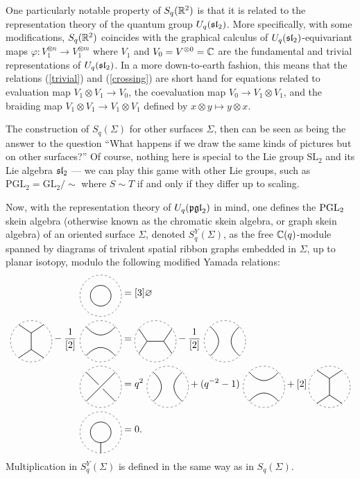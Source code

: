 One particularly notable property of $S_q(\mathbb{R}^2)$ is that
it is related to the representation theory of the quantum group
$U_q(\mathfrak{sl}_2)$. More specifically, with some modifications,
$S_q(\mathbb{R}^2)$ coincides with the graphical calculus of
$U_q(\mathfrak{sl}_2)$-equivariant maps $\varphi: V_1^{\otimes n} \to V_1^{\otimes m}$
where $V_1$ and $V_0 = V^{\otimes 0} = \mathbb{C}$
are the fundamental and trivial representations of $U_q(\mathfrak{sl}_2)$.
In a more down-to-earth fashion, this means that the relations
(\ref{trivial}) and (\ref{crossing}) are short hand for equations
related to evaluation map $V_1 \otimes V_1 \to V_0$, the coevaluation map $V_0 \to V_1 \otimes V_1$,
and the braiding map $V_1 \otimes V_1 \to V_1 \otimes V_1$ defined by
$x \otimes y \mapsto y \otimes x$.

The construction of $S_q(\Sigma)$ for other surfaces $\Sigma$,
then can be seen as being the answer to the question
``What happens if we draw the same kinds of pictures but on
other surfaces?'' Of course, nothing here is special to the Lie 
group $\mathrm{SL}_2$ and its Lie algebra $\mathfrak{sl}_2$ --- we can
play this game with other Lie groups, such as $\mathrm{PGL}_2 = \mathrm{GL}_2/\sim$
where $S \sim T$ if and only if they differ up to scaling.

Now, with the representation theory of $U_q(\mathfrak{pgl}_2)$ in mind,
one defines the $\mathrm{PGL}_2$ skein algebra (otherwise known as the chromatic skein algebra,
or graph skein algebra) of an oriented surface $\Sigma$, denoted $S_q^Y(\Sigma)$, 
as the free $\mathbb{C}(q)$-module spanned by diagrams of trivalent spatial ribbon
graphs embedded in $\Sigma$, up to planar isotopy, modulo
the following modified Yamada relations:
\begin{align}
    \scalebox{0.75}{\trivialcomponent} & = [3]\varnothing \\
    \scalebox{0.75}{\itangle} - \frac{1}{[2]} \ \scalebox{0.75}{\horizontalresolution} & = \scalebox{0.75}{\htangle} - \frac{1}{[2]} \ \scalebox{0.75}{\verticalresolution} \\
    \scalebox{0.75}{\positivecrossing} & = q^2 \ \scalebox{0.75}{\verticalresolution} + (q^{-2} - 1)\ \scalebox{0.75}{\horizontalresolution} + [2] \, \scalebox{0.75}{\itangle}\\
    \scalebox{0.75}{\monogon} &= 0.
\end{align}
Multiplication in $S_q^Y(\Sigma)$ is defined in the same way as
in $S_q(\Sigma)$.

